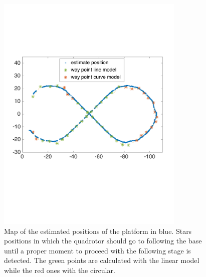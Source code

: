 \begin{figure}[!htbp]
    \centering
    \includegraphics[width=0.8\textwidth]{img/following_platform_long_map_waypoints.pdf}
    \caption{Map of the estimated positions of the platform in blue.  Stars positions in which the quadrotor should go to following the base until a proper moment to proceed with the following stage is detected. The green points are calculated with the linear model while the red ones with the circular. }
    \label{fig:map_waypoints}
\end{figure}

